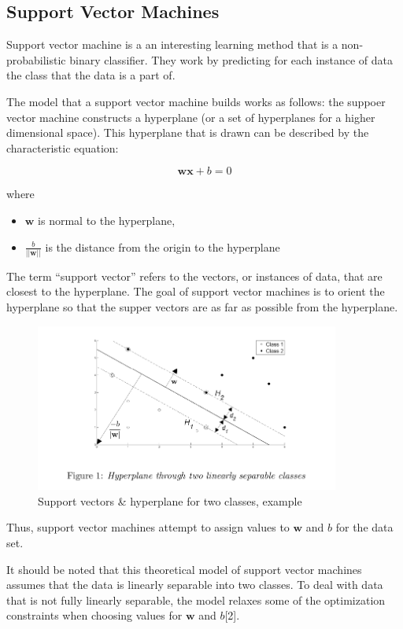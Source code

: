 \documentclass[a4paper,10pt]{article}
\begin{document}
\subsection{Support Vector Machines}

Support vector machine is a an interesting learning method that is a non-probabilistic binary classifier. They work by
predicting for each instance of data the class that the data is a part of.

The model that a support vector machine builds works as follows: the suppoer vector machine constructs a hyperplane 
(or a set of hyperplanes for a higher dimensional space). This hyperplane that is drawn can be described by the
characteristic equation:

$$ \textbf{w} \textbf{x} + b = 0 $$

 where 
\begin{itemize}
 \item $\textbf{w}$ is normal to the hyperplane,
   \item $\frac{b}{||\textbf{w}||}$ is the distance from the origin to the hyperplane
\end{itemize}

The term ``support vector'' refers to the vectors, or instances of data, that are closest to the hyperplane. The goal of
support vector machines is to orient the hyperplane so that the supper vectors are as far as possible from the hyperplane.

\begin{figure}[h]
 \centering
 \includegraphics[width=100mm]{../resources/svm-example.png}
 \caption{Support vectors \& hyperplane for two classes, example}
\end{figure}

Thus, support vector machines attempt to assign values to $\textbf{w}$ and $b$ for the data set.

It should be noted that this theoretical model of support vector machines assumes that the data is linearly separable into 
two classes. To deal with data that is not fully linearly separable, the model relaxes some of the optimization constraints
when choosing values for $\textbf{w}$ and $b$[2].
\end{document}
